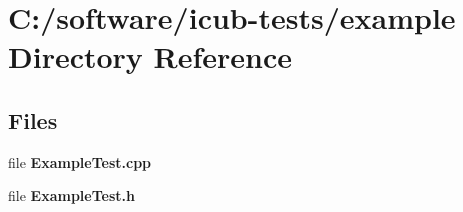 \section{C\+:/software/icub-\/tests/example Directory Reference}
\label{dir_cfafba98a580ce4b62f8a6fa96d7cbb0}
\subsection*{Files}
\begin{DoxyCompactItemize}
\item 
file {\bfseries Example\+Test.\+cpp}
\item 
file {\bfseries Example\+Test.\+h}
\end{DoxyCompactItemize}

